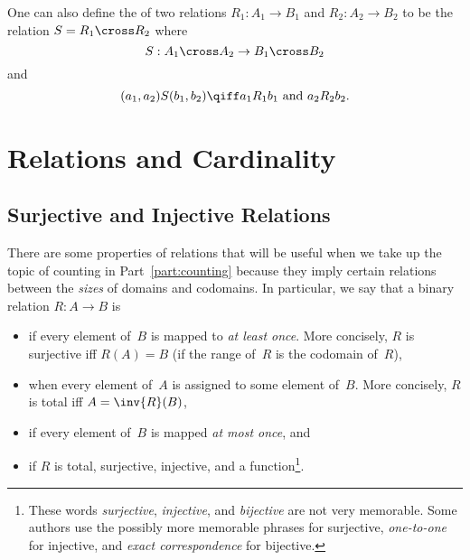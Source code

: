 One can also define the  of two relations $R_1 : A_1 \to
B_1$ and $R_2 : A_2 \to B_2$ to be the relation $S = R_1 \cross R_2$
where
\begin{equation*}
    S : A_1 \cross A_2 \to B_1 \cross B_2
\end{equation*}
and
\begin{equation*}
    (a_1, a_2) S (b_1, b_2) \qiff a_1 R_1 b_1 \text{ and } a_2 R_2 b_2.
\end{equation*}

\section{Relations and Cardinality}

\subsection{Surjective and Injective
  Relations}\label{sec:surj-inj-rels}

There are some properties of relations that will be useful when we
take up the topic of counting in Part~\ref{part:counting} because they
imply certain relations between the \emph{sizes} of domains and
codomains.  In particular, we say that a binary relation $R: A \to B$
is
\begin{itemize}

\item
{} if every element of~$B$ is mapped to \emph{at least
  once}.  More concisely, $R$ is surjective
iff $R(A) = B$ (\ie if the range of~$R$ is the codomain of~$R$),

\item
{} when every element of~$A$ is assigned to some element
of~$B$.  More concisely, $R$ is total iff $A = \inv{R}(B)$,

\item
{} if every element of~$B$ is mapped \emph{at most
  once}, and

\item
{} if $R$ is total, surjective, injective, and a
function\footnote{These words \emph{surjective}, \emph{injective}, and
  \emph{bijective} are not very memorable.  Some authors use the
  possibly more memorable phrases  for surjective,
  \emph{one-to-one} for injective, and \emph{exact correspondence} for
  bijective.}.

\end{itemize}

